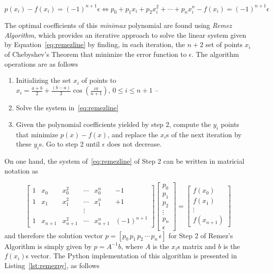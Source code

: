 \begin{equation}\label{eq:remezline}
    p(x_i) - f(x_i) = (-1)^{n+1} \epsilon \Leftrightarrow p_0 + p_1 x_i + p_2 x_i^2 + \cdots + p_n x_i^n - f(x_i) = (-1)^{n+1} \epsilon
\end{equation}

The optimal coefficients of this \textit{minimax} polynomial are found using \textit{Remez Algorithm}, which provides an iterative approach to solve the linear system given by Equation~\ref{eq:remezline} by finding, in each iteration, the $n+2$ set of points $x_i$ of Chebyshev's Theorem that minimize the error function to $\epsilon$. The algorithm operations are as follows 

\begin{enumerate}
    \item Initializing the set $x_i$ of points to $x_i = \frac{a+b}{2} + \frac{(b-a)}{2}\cos\left(\frac{i\pi}{n+1}\right), \, 0 \leq i \leq n+1$ -- 
    \item Solve the system in~\ref{eq:remezline}
    \item Given the polynomial coefficients yielded by step 2, compute the $y_i$ points that minimize $p(x)-f(x)$, and replace the $x_i$s of the next iteration by these $y_i$s. Go to step 2 until $\epsilon$ does not decrease.
\end{enumerate}

On one hand, the system of~\ref{eq:remezline} of Step 2 can be written in matricial notation as

\begin{equation}
\begin{bmatrix} 1 & x_0 & x_0^2 & \cdots & x_0^n & - 1 \\ 1 & x_1 & x_1^2 & \cdots & x_1^n & + 1 \\  &  &  & \vdots & & \\ 1 & x_{n+1} & x_{n+1}^2 & \cdots & x_{n+1}^n & (-1)^{n+1} \end{bmatrix}
\begin{bmatrix} p_0 \\ p_1 \\ p_2 \\ \vdots \\ p_n \\ \epsilon \end{bmatrix} = \begin{bmatrix} f(x_0) \\ f(x_1) \\ \vdots \\ f(x_{n+1}) \end{bmatrix}
\end{equation}
and therefore the solution vector $p = \left[p_0 \, p_1 \, p_2 \, \cdots \, p_n \, \epsilon \right]$ for Step 2 of Remez's Algorithm is simply given by $p = A^{-1}b$, where $A$ is the $x_i$s matrix and $b$ is the $f(x_i)$s vector. The Python implementation of this algorithm is presented in Listing~\ref{lst:remezpy}, as follows


